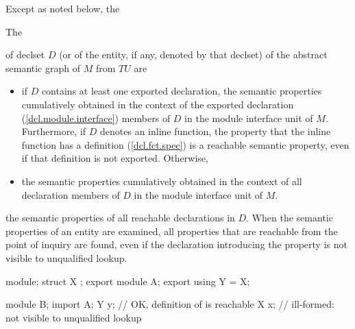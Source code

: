 \begin{std.txt}
  \alinea
\begin{before}\color{addclr}
  Except as noted below, the 
\end{before}
\begin{after}\color{addclr}
The
\end{after}
   of declset $D$
  (or of the entity, if any, denoted by that declset)
  of the abstract semantic graph of $M$ from $TU$ are 
\begin{before}\color{addclr}
  \begin{itemize}
    \item if $D$ contains at least one exported declaration, 
    the semantic properties cumulatively obtained in the context
    of the exported declaration (\ref{dcl.module.interface}) 
    members of $D$ in the module interface
    unit of $M$. Furthermore, if $D$ denotes an inline function,
    the property that the inline function has a definition
    (\ref{dcl.fct.spec}) is a reachable semantic property, even 
    if that definition is not exported. Otherwise,
    \item the semantic properties cumulatively obtained in the context of all
    declaration members of $D$ in the module interface unit of $M$.
  \end{itemize}
\end{before}
\begin{after}\color{addclr}
  the semantic properties of all reachable declarations in $D$.
  When the semantic properties of an entity are examined,
  all properties that are reachable from
  the point of inquiry are found,
  even if the declaration introducing the property
  is not visible to unqualified lookup.
\begin{example}
\begin{codeblock}
module;
struct X {};
export module A;
export using Y = X;

module B;
import A;
Y y;            // OK, definition of  is reachable
X x;            // ill-formed:  not visible to unqualified lookup
\end{codeblock}
\end{example}


\end{after}
\end{std.txt}
